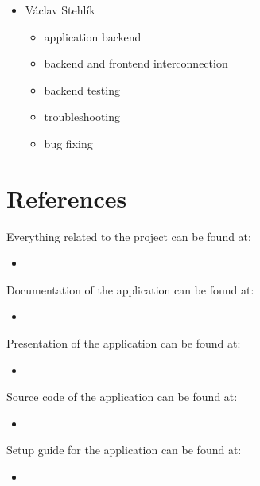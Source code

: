 \documentclass[11pt,a4paper]{article}
\begin{document}
\begin{itemize}
    \item Václav Stehlík
    \begin{itemize}
        \item application backend
        \item backend and frontend interconnection
        \item backend testing
        \item troubleshooting
        \item bug fixing
    \end{itemize}
\end{itemize}

\section{References}\label{sec:references}

Everything related to the project can be found at:
\begin{itemize}
    \item \href{https://github.com/europ/MUNI-FI-PA181}{\color{urlColor}{github.com/europ/MUNI-FI-PA181}}
\end{itemize}

Documentation of the application can be found at:
\begin{itemize}
    \item \href{https://github.com/europ/MUNI-FI-PA181/blob/master/doc/doc.pdf}{\color{urlColor}{github.com/europ/MUNI-FI-PA181/blob/master/doc/doc.pdf}}
\end{itemize}

Presentation of the application can be found at:
\begin{itemize}
    \item \href{https://github.com/europ/MUNI-FI-PA181/blob/master/pres2/pres.pdf}{\color{urlColor}{github.com/europ/MUNI-FI-PA181/blob/master/pres2/pres.pdf}}
\end{itemize}

Source code of the application can be found at:
\begin{itemize}
    \item \href{https://github.com/europ/MUNI-FI-PA181/tree/master/src}{\color{urlColor}{github.com/europ/MUNI-FI-PA181/tree/master/src}}
\end{itemize}

Setup guide for the application can be found at:
\begin{itemize}
    \item \href{https://github.com/europ/MUNI-FI-PA181/wiki/Setup}{\color{urlColor}{github.com/europ/MUNI-FI-PA181/wiki/Setup}}
\end{itemize}
\end{document}
